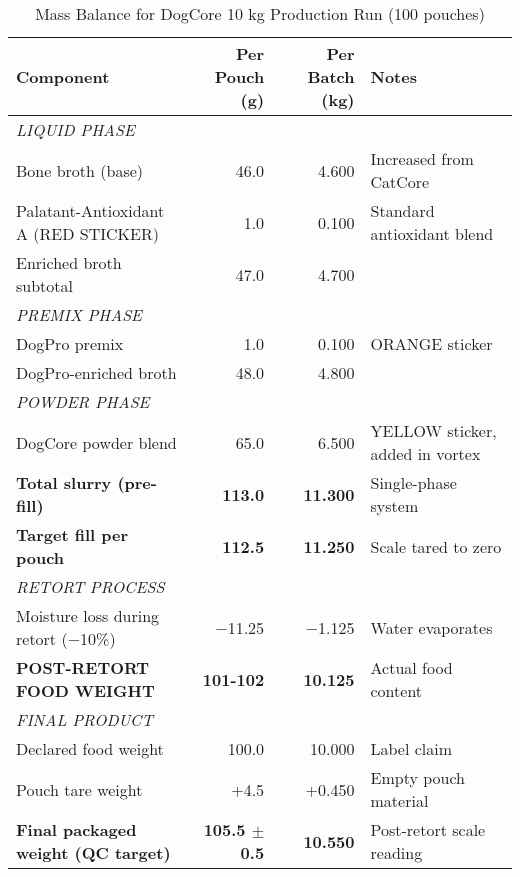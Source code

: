 \begin{table}[h]
\centering
\caption{Mass Balance for DogCore 10 kg Production Run (100 pouches)}
\label{tab:mass_balance_dogcore}
\begin{tabular}{@{}lrrl@{}}
\toprule
\textbf{Component} & \textbf{Per Pouch (g)} & \textbf{Per Batch (kg)} & \textbf{Notes} \\
\midrule
\multicolumn{4}{l}{\textit{LIQUID PHASE}} \\
Bone broth (base) & 46.0 & 4.600 & Increased from CatCore \\
Palatant-Antioxidant A (RED STICKER) & 1.0 & 0.100 & Standard antioxidant blend \\
Enriched broth subtotal & 47.0 & 4.700 & \\
\midrule
\multicolumn{4}{l}{\textit{PREMIX PHASE}} \\
DogPro premix & 1.0 & 0.100 & ORANGE sticker \\
DogPro-enriched broth & 48.0 & 4.800 & \\
\midrule
\multicolumn{4}{l}{\textit{POWDER PHASE}} \\
DogCore powder blend & 65.0 & 6.500 & YELLOW sticker, added in vortex \\
\midrule
\textbf{Total slurry (pre-fill)} & \textbf{113.0} & \textbf{11.300} & Single-phase system \\
\textbf{Target fill per pouch} & \textbf{112.5} & \textbf{11.250} & Scale tared to zero \\
\midrule
\multicolumn{4}{l}{\textit{RETORT PROCESS}} \\
Moisture loss during retort ($-$10\%) & $-$11.25 & $-$1.125 & Water evaporates \\
\textbf{POST-RETORT FOOD WEIGHT} & \textbf{101-102} & \textbf{10.125} & Actual food content \\
\midrule
\multicolumn{4}{l}{\textit{FINAL PRODUCT}} \\
Declared food weight & 100.0 & 10.000 & Label claim \\
Pouch tare weight & +4.5 & +0.450 & Empty pouch material \\
\textbf{Final packaged weight (QC target)} & \textbf{105.5 $\pm$ 0.5} & \textbf{10.550} & Post-retort scale reading \\
\bottomrule
\end{tabular}
\end{table}

\clearpage


